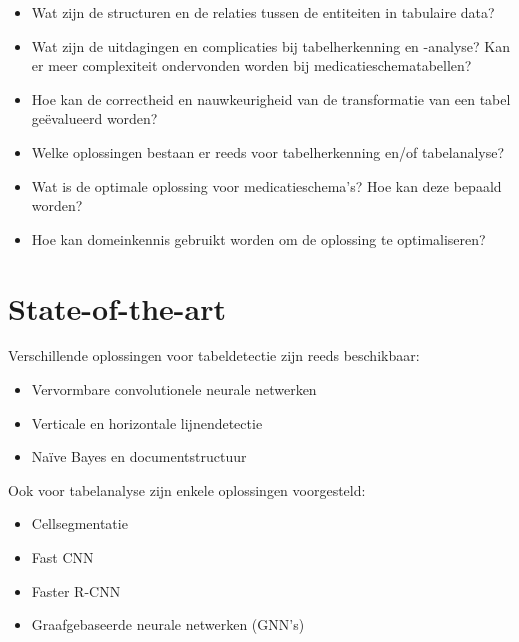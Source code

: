 \noindent \begin{itemize}
  \item Wat zijn de structuren en de relaties tussen de entiteiten in tabulaire data?
  \item Wat zijn de uitdagingen en complicaties bij tabelherkenning en -analyse? Kan er meer complexiteit ondervonden worden bij medicatieschematabellen?
  \item Hoe kan de correctheid en nauwkeurigheid van de transformatie van een tabel geëvalueerd worden?
  \item Welke oplossingen bestaan er reeds voor tabelherkenning en/of tabelanalyse?
  \item Wat is de optimale oplossing voor medicatieschema's? Hoe kan deze bepaald worden?
  \item Hoe kan domeinkennis gebruikt worden om de oplossing te optimaliseren?
\end{itemize}


\section{State-of-the-art}
\label{sec:state-of-the-art}

Verschillende oplossingen voor tabeldetectie zijn reeds beschikbaar:

\begin{itemize}
    \item Vervormbare convolutionele neurale netwerken \autocite{Siddiqui2018}
    \item Verticale en horizontale lijnendetectie \autocite{Gatos2005}
    \item Naïve Bayes en documentstructuur \autocite{Li2006}
\end{itemize}
\hfill \break
\noindent Ook voor tabelanalyse zijn enkele oplossingen voorgesteld: 

\begin{itemize}
    \item Cellsegmentatie \autocite{Nazemi2016}
    \item Fast CNN \autocite{Oliveira2017}
    \item Faster R-CNN \autocite{Schreiber2017}
    \item Graafgebaseerde neurale netwerken (GNN's) \autocite{Qasim2019}
\end{itemize}


